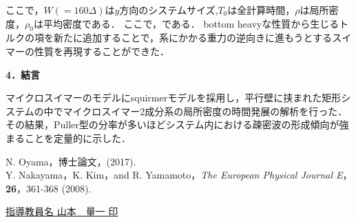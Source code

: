 \documentclass[twocolumns,10pt,a4j]{jarticle}
\begin{document}

  \noindent
ここで，$W(=160\Delta)$は$y$方向のシステムサイズ,$T_0$は全計算時間，$\rho$は局所密度，$\rho_0$は平均密度である．
ここで，である．
bottom heavyな性質から生じるトルクの項を新たに追加することで，系にかかる重力の逆向きに進もうとするスイマーの性質を再現することができた．




  \noindent
  \textbf{\large 4．結言}
  \par
マイクロスイマーのモデルにsquirmerモデルを採用し，平行壁に挟まれた矩形システムの中でマイクロスイマー2成分系の局所密度の時間発展の解析を行った．
その結果，Puller型の分率が多いほどシステム内における疎密波の形成傾向が強まることを定量的に示した．
  \vspace{-7.5truemm}


  \renewcommand{\refname}{\normalsize 参考文献\vspace{-3truemm}}
  \begin{thebibliography}{9}
    N. Oyama，博士論文，(2017).\\
  \vspace{-7truemm}
    Y. Nakayama，K. Kim，and R. Yamamoto，\textit{The European Physical Journal E}，\textbf{26}，361-368 (2008).\\
  \end{thebibliography}


  \vspace{-7truemm}
  \centering
  \underline{指導教員名\hspace{10truemm} 山本　量一 \hspace{20truemm} 印}

\end{document}
